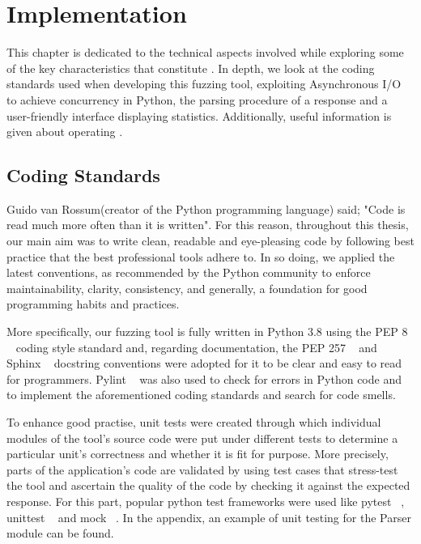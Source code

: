 \chapter{Implementation}
\label{sec:implementation}
\minitoc
\vspace*{1cm}

This chapter is dedicated to the technical aspects involved while exploring some of the key characteristics that constitute \pname{}. In depth, we look at the coding standards used when developing this fuzzing tool, exploiting Asynchronous I/O to achieve concurrency in Python, the parsing procedure of a response and a user-friendly interface displaying statistics. Additionally, useful information is given about operating \pname{}.


\section{Coding Standards}
Guido van Rossum(creator of the Python programming language) said; "Code is read much more often than it is written". For this reason, throughout this thesis, our main aim was to write clean, readable and eye-pleasing code by following best practice that the best professional tools adhere to. In so doing, we applied the latest conventions, as recommended by the Python community to enforce maintainability, clarity, consistency, and generally, a foundation for good programming habits and practices. 

More specifically, our fuzzing tool is fully written in Python 3.8 using the PEP 8 ~\cite{python_pep8} coding style standard and, regarding documentation, the PEP 257 ~\cite{python_pep257} and Sphinx ~\cite{sphinx} docstring conventions were adopted for it to be clear and easy to read for programmers. Pylint ~\cite{pylint_module} was also used to check for errors in Python code and to implement the aforementioned coding standards and search for code smells.

To enhance good practise, unit tests were created through which individual modules of the tool's source code were put under different tests to determine a particular unit's correctness and whether it is fit for purpose. More precisely, parts of the application's code are validated by using test cases that stress-test the tool and ascertain the quality of the code by checking it against the expected response. For this part, popular python test frameworks were used like pytest ~\cite{pytest_module}, unittest ~\cite{unittest_module} and mock ~\cite{mock}. In the appendix, an example of unit testing for the Parser module can be found.

